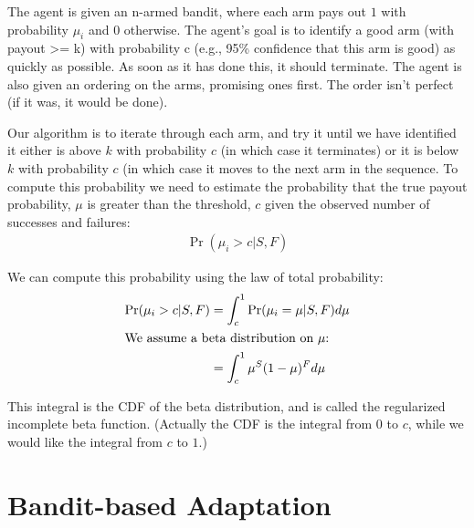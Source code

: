 \documentclass{article}
\begin{document}
The agent is given an n-armed bandit, where each arm pays out $1$ with
probability $\mu_i$ and $0$ otherwise.  The agent's goal is to
identify a good arm (with payout >= k) with probability c (e.g., 95\%
confidence that this arm is good) as quickly as possible.  As soon as
it has done this, it should terminate.  The agent is also given an
ordering on the arms, promising ones first.  The order isn't perfect
(if it was, it would be done).

Our algorithm is to iterate through each arm, and try it until we have
identified it either is above $k$ with probability $c$ (in which case
it terminates) or it is below $k$ with probability $c$ (in which case
it moves to the next arm in the sequence.  To compute this probability
we need to estimate the probability that the true payout probability,
$\mu$ is greater than the threshold, $c$ given the observed number of
successes and failures:
\begin{align}
\Pr(\mu_i > c|  S, F)
\end{align}

We can compute this probability using the law of total probability:
\begin{align}
\Pr(\mu_i > c|  S, F) &= \int_c^1 \Pr(\mu_i=\mu | S, F) d\mu\\
\intertext{We assume a beta distribution on $\mu$:}
                      &= \int_c^1 \mu^S (1- \mu) ^F d\mu
\end{align}

This integral is the CDF of the beta distribution, and is called the
regularized incomplete beta function.  (Actually the CDF is the
integral from $0$ to $c$, while we would like the integral from $c$ to
$1$.)


\section{Bandit-based Adaptation}
\end{document}
